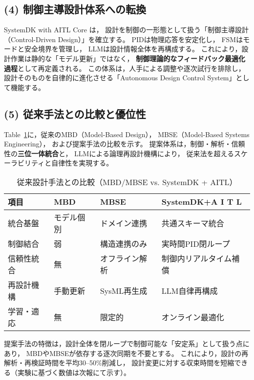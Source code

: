 \subsection{(4) 制御主導設計体系への転換}
SystemDK with AITL Core は，
設計を制御の一形態として扱う「制御主導設計（Control-Driven Design）」を確立する。
PIDは物理応答を安定化し，
FSMはモードと安全境界を管理し，
LLMは設計情報全体を再構成する。
これにより，設計作業は静的な「モデル更新」ではなく，
\textbf{制御理論的なフィードバック最適化過程}として再定義される。
この体系は，人手による調整や逐次試行を排除し，
設計そのものを自律的に進化させる「Autonomous Design Control System」として機能する。

\subsection{(5) 従来手法との比較と優位性}
Table~\ref{tab:compare}に，従来のMBD（Model-Based Design），
MBSE（Model-Based Systems Engineering），
および提案手法の比較を示す。
提案体系は，制御・解析・信頼性の\textbf{三位一体統合}と，
LLMによる論理再設計機構により，
従来法を超えるスケーラビリティと自律性を実現する。

\begin{table}[t]
  \centering
  \caption{従来設計手法との比較（MBD/MBSE vs. SystemDK + AITL）}
  \label{tab:compare}
  \footnotesize
  \setlength{\tabcolsep}{3pt}
  \renewcommand{\arraystretch}{1.12}
  \begin{tabular}{p{18mm} p{16mm} p{16mm} p{25mm}}
    \toprule
    項目 & MBD & MBSE & SystemDK+A I T L \\
    \midrule
    統合基盤 & モデル個別 & ドメイン連携 & 共通スキーマ統合 \\
    制御結合 & 弱 & 構造連携のみ & 実時間PID閉ループ \\
    信頼性統合 & 無 & オフライン解析 & 制御内リアルタイム補償 \\
    再設計機構 & 手動更新 & SysML再生成 & LLM自律再構成 \\
    学習・適応 & 無 & 限定的 & オンライン最適化 \\
    \bottomrule
  \end{tabular}
\end{table}

提案手法の特徴は，設計全体を閉ループで制御可能な「安定系」として扱う点にあり，
MBDやMBSEが依存する逐次同期を不要とする。
これにより，設計の再解析・再検証時間を平均30–50\%削減し，
設計変更に対する収束時間を短縮できる（実験に基づく数値は次報にて示す）。

